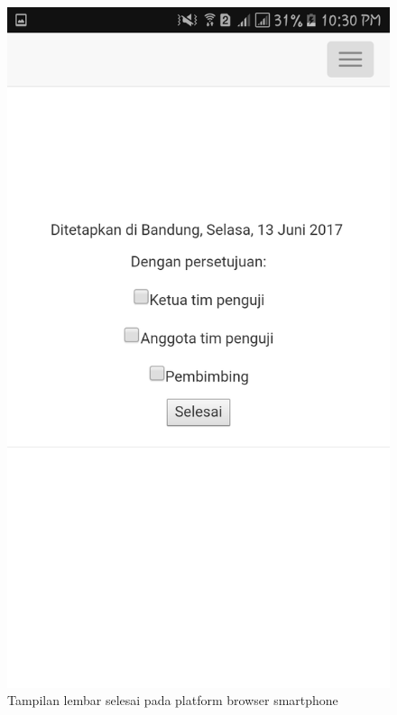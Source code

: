 \begin{figure}[H]
	\centering
	\includegraphics[scale=0.2]{Gambar/hp_selesai}
	\caption{Tampilan lembar selesai pada platform browser smartphone}
	\label{fig:hp_selesai}
\end{figure}